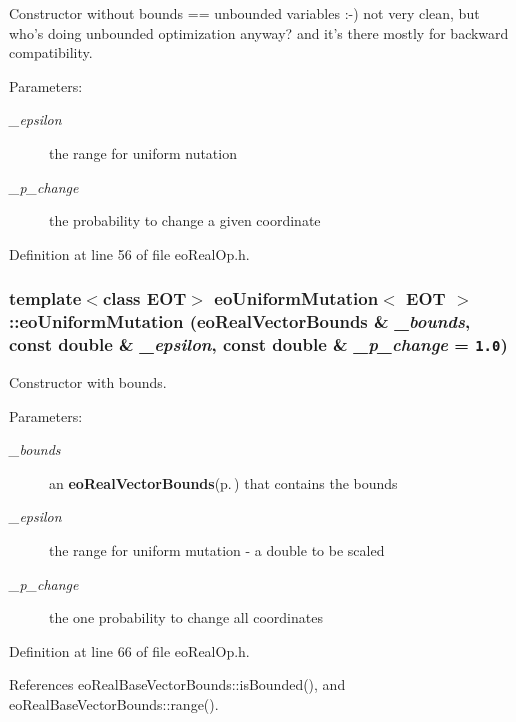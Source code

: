 Constructor without bounds == unbounded variables :-) not very clean, but who's doing unbounded optimization anyway? and it's there mostly for backward compatibility. 

\begin{Desc}
\item[Parameters:]
\begin{description}
\item[{\em \_\-epsilon}]the range for uniform nutation \item[{\em \_\-p\_\-change}]the probability to change a given coordinate \end{description}
\end{Desc}


Definition at line 56 of file eo\-Real\-Op.h.
\subsubsection{\setlength{\rightskip}{0pt plus 5cm}template$<$class EOT$>$ {\bf eo\-Uniform\-Mutation}$<$ {\bf EOT} $>$::{\bf eo\-Uniform\-Mutation} ({\bf eo\-Real\-Vector\-Bounds} \& {\em \_\-bounds}, const double \& {\em \_\-epsilon}, const double \& {\em \_\-p\_\-change} = {\tt 1.0})\hspace{0.3cm}{\tt  [inline]}}\label{classeo_uniform_mutation_a1}


Constructor with bounds. 

\begin{Desc}
\item[Parameters:]
\begin{description}
\item[{\em \_\-bounds}]an {\bf eo\-Real\-Vector\-Bounds}{\rm (p.\,\pageref{classeo_real_vector_bounds})} that contains the bounds \item[{\em \_\-epsilon}]the range for uniform mutation - a double to be scaled \item[{\em \_\-p\_\-change}]the one probability to change all coordinates \end{description}
\end{Desc}


Definition at line 66 of file eo\-Real\-Op.h.

References eo\-Real\-Base\-Vector\-Bounds::is\-Bounded(), and eo\-Real\-Base\-Vector\-Bounds::range().
